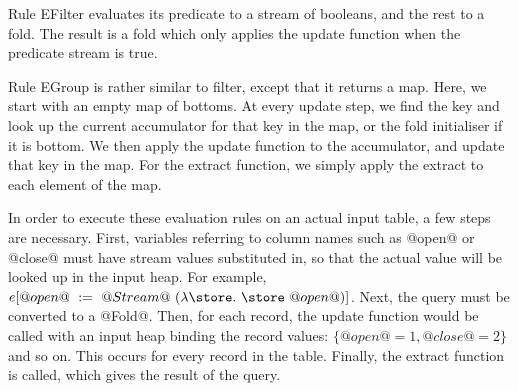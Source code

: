 Rule EFilter evaluates its predicate to a stream of booleans, and the rest to a fold.
The result is a fold which only applies the update function when the predicate stream is true.

Rule EGroup is rather similar to filter, except that it returns a map.
Here, we start with an empty map of bottoms.
At every update step, we find the key and look up the current accumulator for that key in the map, or the fold initialiser if it is bottom.
We then apply the update function to the accumulator, and update that key in the map.
For the extract function, we simply apply the extract to each element of the map.

In order to execute these evaluation rules on an actual input table, a few steps are necessary.
First, variables referring to column names such as @open@ or @close@ must have stream values substituted in, so that the actual value will be looked up in the input heap.
For example, $e[@open@~:=~@Stream@~(\lam{\store} \store~@open@)]$.
Next, the query must be converted to a @Fold@.
Then, for each record, the update function would be called with an input heap binding the record values: $\{@open@ = 1, @close@ = 2\}$ and so on.
This occurs for every record in the table.
Finally, the extract function is called, which gives the result of the query.

